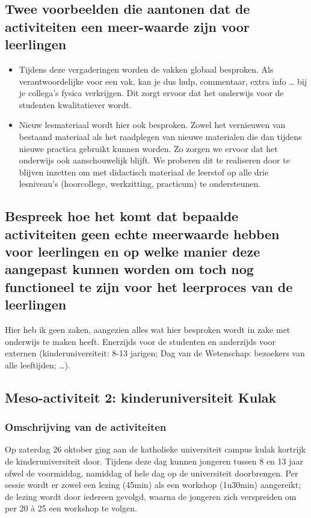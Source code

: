 \documentclass[a4paper,12pt,twoside]{article}%
\begin{document}
	\subsection{Twee voorbeelden die aantonen dat de activiteiten een meer-waarde zijn voor leerlingen}
	\begin{itemize}
		\item Tijdens deze vergaderingen worden de vakken globaal besproken. Als verantwoordelijke voor een vak, kan je dus hulp, commentaar, extra info \ldots{} bij je collega's fysica verkrijgen. Dit zorgt ervoor dat het onderwijs voor de studenten kwalitatiever wordt. 
		\item Nieuw lesmateriaal wordt hier ook besproken. Zowel het vernieuwen van bestaand materiaal als het raadplegen van nieuwe materialen die dan tijdens nieuwe practica gebruikt kunnen worden. Zo zorgen we ervoor dat het onderwijs ook aanschouwelijk blijft. We proberen dit te realiseren door te blijven inzetten om met didactisch materiaal de leerstof op alle drie lesniveau's (hoorcollege, werkzitting, practicum) te ondersteunen.
	\end{itemize}
	
	\subsection{Bespreek hoe het komt dat bepaalde activiteiten geen echte meerwaarde hebben voor leerlingen en op welke manier deze aangepast kunnen worden om toch nog functioneel te zijn voor het leerproces van de leerlingen}
	Hier heb ik geen zaken, aangezien alles wat hier besproken wordt in zake met onderwijs te maken heeft. Enerzijds voor de studenten en anderzijds voor externen (kinderuniversiteit: 8-13 jarigen; Dag van de Wetenschap: bezoekers van alle leeftijden; \ldots).


	
	\subsection{Meso-activiteit 2: kinderuniversiteit Kulak}
	\subsubsection{Omschrijving van de activiteiten}  Op zaterdag 26 oktober ging aan de katholieke universiteit campus kulak kortrijk de kinderuniversiteit door. Tijdens deze dag kunnen jongeren tussen 8 en 13 jaar ofwel de voormiddag, namiddag of hele dag op de universiteit doorbrengen. Per sessie wordt er zowel een lezing (45min) als een workshop (1u30min) aangereikt; de lezing wordt door iedereen gevolgd, waarna de jongeren zich verspreiden om per 20 à 25 een workshop te volgen.\newline
	
\end{document}
